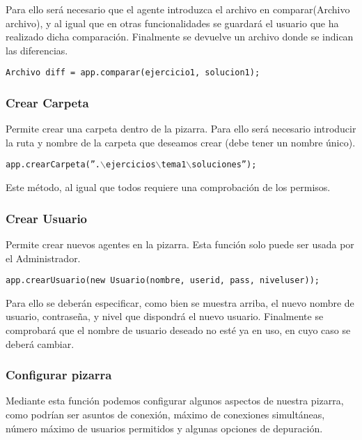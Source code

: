 Para ello será necesario que el agente introduzca el archivo en comparar(Archivo archivo), y al igual que en otras funcionalidades se guardará el usuario que ha realizado dicha comparación. Finalmente se devuelve un archivo donde se indican las diferencias.

\begin{center}
\texttt{Archivo diff = app.comparar(ejercicio1, solucion1);}
\end{center}

\subsubsection{Crear Carpeta}
Permite crear una carpeta dentro de la pizarra. Para ello será necesario introducir la ruta y nombre de la carpeta que deseamos crear (debe tener un nombre único).

\begin{center}
\texttt{app.crearCarpeta(''.$\backslash$ejercicios$\backslash$tema1$\backslash$soluciones'');}
\end{center}

Este método, al igual que todos requiere una comprobación de los permisos.

\subsubsection{Crear Usuario}
Permite crear nuevos agentes en la pizarra. Esta función solo puede ser usada por el Administrador.\\

\begin{center}
\texttt{app.crearUsuario(new Usuario(nombre, userid, pass, niveluser));}
\end{center}

Para ello se deberán especificar, como bien se muestra arriba, el nuevo nombre de usuario, contraseña, y nivel que dispondrá el nuevo usuario. Finalmente se comprobará que el nombre de usuario deseado no esté ya en uso, en cuyo caso se deberá cambiar.

\subsubsection{Configurar pizarra}
Mediante esta función podemos configurar algunos aspectos de nuestra pizarra, como podrían ser asuntos de conexión, máximo de conexiones simultáneas, número máximo de usuarios permitidos y algunas opciones de depuración.\\

